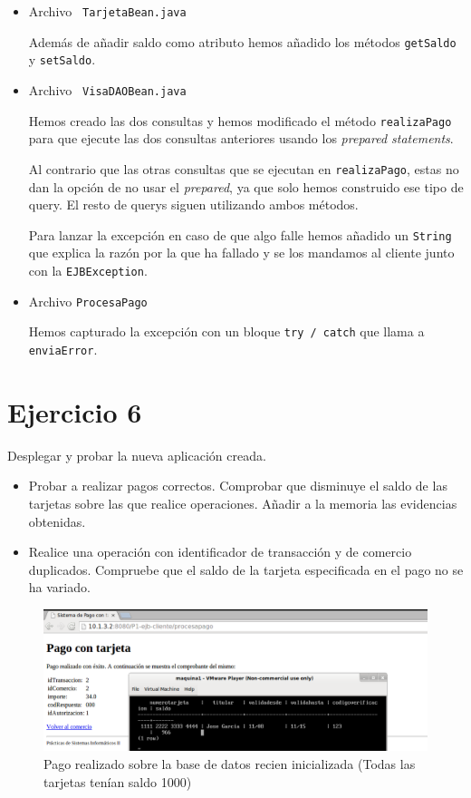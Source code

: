 \documentclass[a4paper, 10pt]{article}
\begin{document}
	 \begin{itemize}
	 	\item Archivo \texttt{ TarjetaBean.java}
	 	
	 	
	 	 Además de añadir saldo como atributo hemos añadido los métodos \texttt{getSaldo} y \texttt{setSaldo}.
	 	 
	 	 
	 	 \item Archivo \texttt{ VisaDAOBean.java}
	 	 
	 	 
	 	 Hemos creado las dos consultas y hemos modificado el método \texttt{realizaPago} para que ejecute las dos consultas anteriores usando los \textit{prepared statements}.
	 	 
	 	 Al contrario que las otras consultas que se ejecutan en \texttt{realizaPago}, estas no dan la opción de no usar el \textit{prepared}, ya que solo hemos construido ese tipo de query. El resto de querys siguen utilizando ambos métodos.
	 	  	 
	 	 Para lanzar la excepción en caso de que algo falle hemos añadido un \texttt{String} que explica la razón por la que ha fallado y se los mandamos al cliente junto con la \texttt{EJBException}.
	 	 
	 	 \item Archivo \texttt{ProcesaPago}
	 	 
	 	 Hemos capturado la excepción con un bloque \texttt{try / catch} que llama a \texttt{enviaError}.
	 \end{itemize}
 

 


\section{Ejercicio 6}
\begin{mdframed}
Desplegar y probar la nueva aplicación creada.
\begin{itemize}
\item Probar a realizar pagos correctos. Comprobar que disminuye el saldo de las tarjetas sobre las que
realice operaciones. Añadir a la memoria las evidencias obtenidas.
\item Realice una operación con identificador de transacción y de comercio duplicados. Compruebe que el
saldo de la tarjeta especificada en el pago no se ha variado. 
\end{itemize}
\end{mdframed}
	\begin{figure}[htbp]
		\centering	
		\includegraphics[width=1\textwidth]{pantallazos/ejercicio6a.png}
		\caption{Pago realizado sobre la base de datos recien inicializada (Todas las tarjetas tenían saldo 1000)}
	\end{figure}
 	
\end{document}
